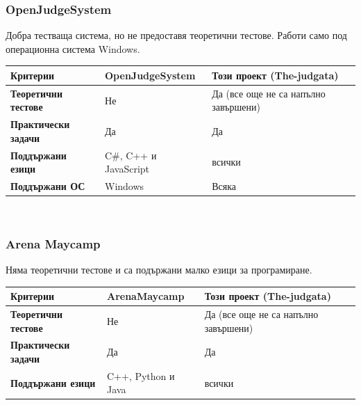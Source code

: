 \documentclass[12pt]{article}
\begin{document}
	\subsubsection{OpenJudgeSystem}
	Добра тестваща система, но не предоставя теоретични тестове. Работи само под операционна система Windows.
	\begin{table}[ht]
	\centering
	\resizebox{\textwidth}{!}
	{
		\begin{tabular}{l|l|l}
			\bf{Критерии} & \bf{OpenJudgeSystem} & \bf{Този проект (The-judgata)}\\
			\hline
			\bf{Теоретични тестове} & Не & Да (все още не са напълно завършени)\\
			\hline
			\bf{Практически задачи} & Да & Да\\
			\hline
			\bf{Поддържани езици} & C\#, C++ и JavaScript & всички\\
			\hline
			\bf{Поддържани ОС} & Windows & Всяка\\
		\end{tabular}
	}
	\end{table}\\
	\subsubsection{Arena Maycamp}
	Няма теоретични тестове и са подържани малко езици за програмиране.
	\begin{table}[ht]
	\centering
	\resizebox{\textwidth}{!}
	{
		\begin{tabular}{l|l|l}
			\bf{Критерии} & \bf{ArenaMaycamp} & \bf{Този проект (The-judgata)}\\
			\hline
			\bf{Теоретични тестове} & Не & Да (все още не са напълно завършени)\\
			\hline
			\bf{Практически задачи} & Да & Да\\
			\hline
			\bf{Поддържани езици} & C++, Python и Java & всички
		\end{tabular}
	}
	\end{table}
\end{document}
